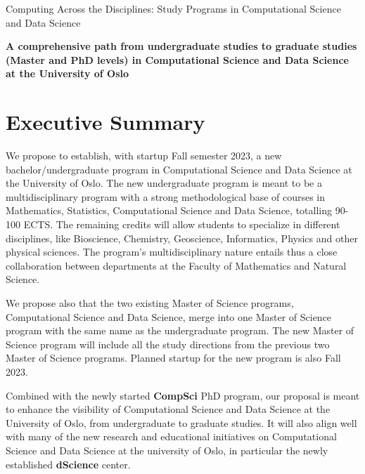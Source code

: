 \documentclass[oneside,final,10pt]{article}
\begin{document}
\thispagestyle{empty}

\begin{center}
{\LARGE\bf
\begin{spacing}{1.25}
Computing Across the Disciplines: Study Programs in Computational Science and Data Science
\end{spacing}
}
\end{center}

\begin{center}
{\bf A comprehensive path from undergraduate studies to graduate studies (Master and PhD levels) in Computational Science and Data Science at the University of Oslo }\\ [0mm]
\end{center}


\vspace{1cm}


\section*{Executive Summary}

We propose to establish, with startup Fall semester 2023, a new bachelor/undergraduate program in Computational Science and Data Science at the University of Oslo. 
The new undergraduate program is meant to be a multidisciplinary program with  a strong methodological base of courses in Mathematics, Statistics, Computational Science and Data Science, totalling 90-100 ECTS. The remaining credits will allow students to specialize in different disciplines, like Bioscience, Chemistry, Geoscience, Informatics, Physics and other physical sciences. The program's multidisciplinary nature entails thus a close collaboration between departments at the Faculty of Mathematics and Natural Science.  

We propose also that the two existing Master of Science programs, Computational Science and Data Science, merge into one Master of Science program with the same name as the undergraduate program. The new Master of Science program will include all the study directions from the previous two Master of Science programs. Planned startup for the new program is also Fall 2023. 

Combined with the newly started {\bf CompSci} PhD program, our proposal is meant to enhance the visibility of Computational Science and Data Science at the University of Oslo, from undergraduate to graduate studies. It will also align well with many of the new research and educational initiatives on Computational Science and Data Science at the university of Oslo, in particular the newly established {\bf dScience} center.
\end{document}
